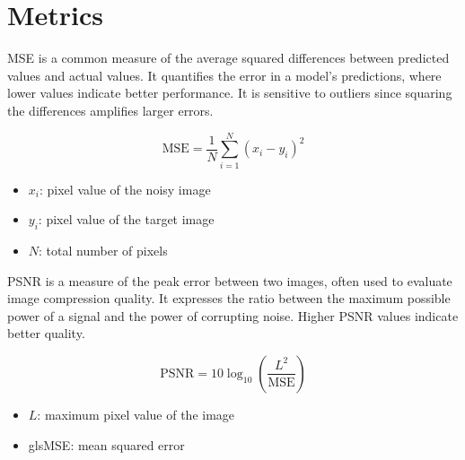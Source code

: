 \section{Metrics}

\Gls{MSE} is a common measure of the average squared differences between predicted values and actual values. It quantifies the error in a model’s predictions, where lower values indicate better performance. It is sensitive to outliers since squaring the differences amplifies larger errors.

\begin{note}
    {}
    \begin{equation}
        \text{MSE} = \frac{1}{N} \sum_{i=1}^{N} (x_i - y_i)^2
    \end{equation}
    \begin{itemize}
        \item $x_i$: pixel value of the noisy image
        \item $y_i$: pixel value of the target image
        \item $N$: total number of pixels
    \end{itemize}
\end{note}

\Gls{PSNR} is a measure of the peak error between two images, often used to evaluate image compression quality. It expresses the ratio between the maximum possible power of a signal and the power of corrupting noise. Higher PSNR values indicate better quality.

\begin{note}
    {}
    \begin{equation}    
        \text{PSNR} = 10 \log_{10} \left( \frac{L^2}{\text{MSE}} \right)
    \end{equation}
    \begin{itemize}
        \item $L$: maximum pixel value of the image
        \item gls{MSE}: mean squared error
    \end{itemize}
\end{note}


